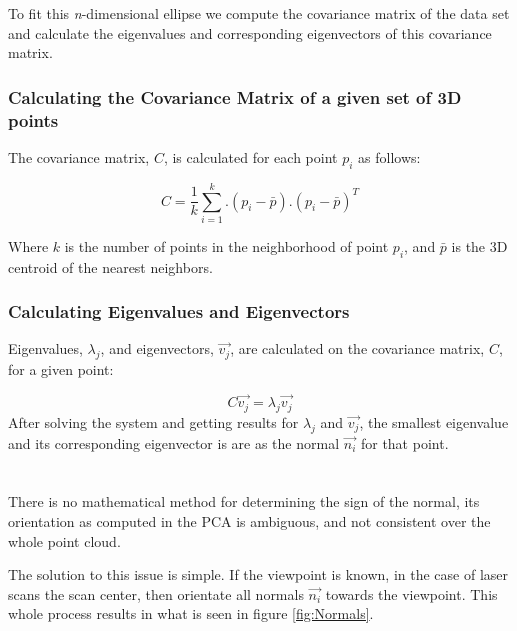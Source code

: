 		To fit this \textit{n}-dimensional ellipse we compute the covariance matrix of the data set and calculate the eigenvalues and corresponding eigenvectors of this covariance matrix.
		
		\subsubsection{Calculating the Covariance Matrix of a given set of 3D points}
			The covariance matrix, $C$, is calculated for each point $p_i$ as follows:
			
			\begin{equation}
			C = \frac{1}{k} \sum_{i=1}^{k}.(p_i - \bar{p}).(p_i - \bar{p})^T
			\end{equation}
			
			Where $k$ is the number of points in the neighborhood of point $p_i$, and $\bar{p}$ is the 3D centroid of the nearest neighbors.
				
		\subsubsection{Calculating Eigenvalues and Eigenvectors}
			Eigenvalues, $\lambda_j$, and eigenvectors, $\vec{v_j}$, are calculated on the covariance matrix, $C$, for a given point:
			
			\begin{equation}
			C \vec{v_j} = \lambda_j \vec{v_j}
			\end{equation}
			After solving the system and getting results for $\lambda_j$ and $\vec{v_j}$, the smallest eigenvalue and its corresponding eigenvector is are as the normal $\vec{n_i}$ for that point.\\
			\\
			\\
			There is no mathematical method for determining the sign of the normal, its orientation as computed in the PCA is ambiguous, and not consistent over the whole point cloud. 
			
			The solution to this issue is simple. If the viewpoint is known, in the case of laser scans the scan center, then orientate all normals $\vec{n_i}$ towards the viewpoint. This whole process results in what is seen in figure \ref{fig:Normals}.
			

